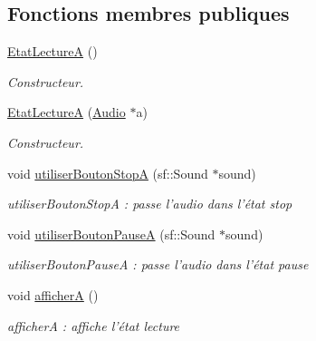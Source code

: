 \subsection*{Fonctions membres publiques}
\begin{DoxyCompactItemize}
\item 
\hypertarget{classEtatLectureA_af296a1105e5b5ad7656b770e58d0b499}{\hyperlink{classEtatLectureA_af296a1105e5b5ad7656b770e58d0b499}{Etat\+Lecture\+A} ()}\label{classEtatLectureA_af296a1105e5b5ad7656b770e58d0b499}

\begin{DoxyCompactList}\small\item\em Constructeur. \end{DoxyCompactList}\item 
\hyperlink{classEtatLectureA_a184cb5df01065ea377e42d6c6167a248}{Etat\+Lecture\+A} (\hyperlink{classAudio}{Audio} $\ast$a)
\begin{DoxyCompactList}\small\item\em Constructeur. \end{DoxyCompactList}\item 
\hypertarget{classEtatLectureA_a6f25a0722b9913e2ed963f9d5e7c29c4}{void \hyperlink{classEtatLectureA_a6f25a0722b9913e2ed963f9d5e7c29c4}{utiliser\+Bouton\+Stop\+A} (sf\+::\+Sound $\ast$sound)}\label{classEtatLectureA_a6f25a0722b9913e2ed963f9d5e7c29c4}

\begin{DoxyCompactList}\small\item\em utiliser\+Bouton\+Stop\+A \+: passe l'audio dans l'état stop \end{DoxyCompactList}\item 
\hypertarget{classEtatLectureA_a079893f8566da8b9ef1bace9bc92aa8e}{void \hyperlink{classEtatLectureA_a079893f8566da8b9ef1bace9bc92aa8e}{utiliser\+Bouton\+Pause\+A} (sf\+::\+Sound $\ast$sound)}\label{classEtatLectureA_a079893f8566da8b9ef1bace9bc92aa8e}

\begin{DoxyCompactList}\small\item\em utiliser\+Bouton\+Pause\+A \+: passe l'audio dans l'état pause \end{DoxyCompactList}\item 
\hypertarget{classEtatLectureA_ad1ca4a4b0fa21d6bc1e51b04187cf63f}{void \hyperlink{classEtatLectureA_ad1ca4a4b0fa21d6bc1e51b04187cf63f}{afficher\+A} ()}\label{classEtatLectureA_ad1ca4a4b0fa21d6bc1e51b04187cf63f}

\begin{DoxyCompactList}\small\item\em afficher\+A \+: affiche l'état lecture \end{DoxyCompactList}\end{DoxyCompactItemize}


